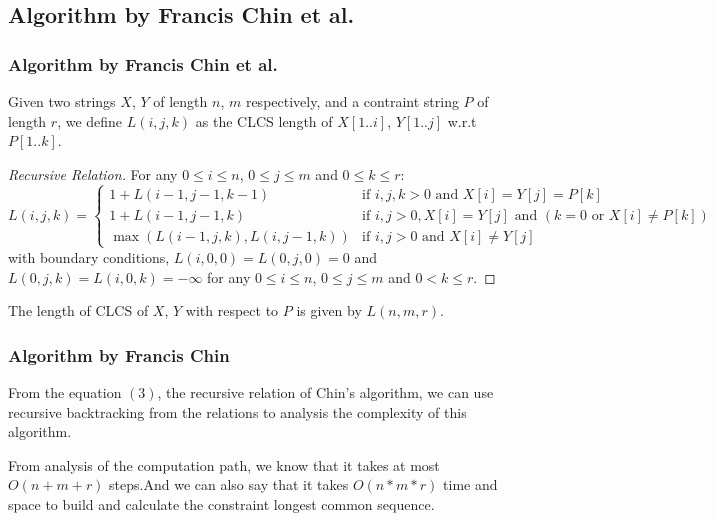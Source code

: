 \documentclass[10pt]{beamer}
\begin{document}
\subsection{Algorithm by Francis Chin et al.}
\begin{frame}
  \frametitle{Algorithm by Francis Chin et al.}
  Given two  strings $X$, $Y$ of length $n$, $m$ respectively, and  a contraint string $P$ of length $r$, we define $L(i, j, k)$ as the CLCS length of $X[1..i]$,  $Y[1..j]$ w.r.t $P[1..k]$.

  \pause
  \begin{proof}[Recursive Relation]
    For any $0\le i \le n$, $0\le j\le m$ and $0\le k \le r$:
    {\scriptsize{
        \begin{equation}\label{eq:recur}
          L(i,j,k)=\left\{
          \begin{array}{ll}
            1+ L(i-1, j-1, k-1) & \textrm{if } i, j, k > 0 \textrm{ and } X[i]= Y[j] = P[k]\\
            1+ L(i-1, j-1, k)    & \textrm{if } i, j > 0, X[i]=Y[j] \textrm{ and } (k=0 \textrm{ or } X[i]\neq P[k])\\
            \max(L(i-1, j, k), L(i, j-1, k)) & \textrm{if } i, j > 0 \textrm{ and } X[i]\neq Y[j]
          \end{array}
          \right.
        \end{equation}
      }
    }
    with boundary conditions, $L(i, 0, 0)=L(0, j, 0)=0$ and $L(0, j, k)= L(i, 0, k)=-\infty$ for any $0\le i \le n$, $0\le j\le m$ and $0< k \le r$.
  \end{proof}
  
  \vskip10pt
  \pause
  The length of CLCS of $X$, $Y$ with respect to $P$ is given by $L(n,m,r)$. 

\end{frame}

\begin{frame}
  \frametitle{Algorithm by Francis Chin}
  From the equation $(3)$, the recursive relation of Chin's algorithm, we can use recursive backtracking from the relations to analysis the complexity of this algorithm.

  \vskip10pt
  \pause
  From analysis of the computation path, we know that it takes at most $O(n + m + r)$ steps.And we can also say that it takes $O(n*m*r)$ time and space to build and calculate the constraint longest common sequence.
  
\end{frame}
\end{document}
